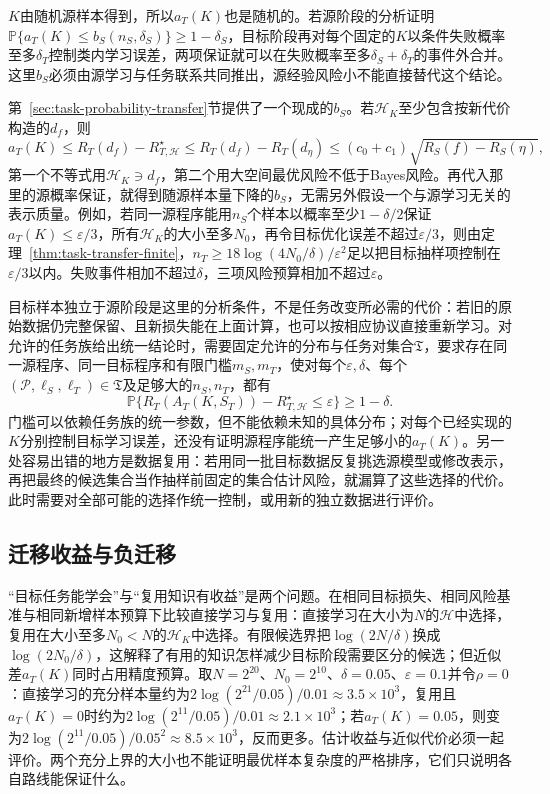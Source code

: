 $K$由随机源样本得到，所以$a_T(K)$也是随机的。若源阶段的分析证明$\mathbb P\{a_T(K)\leq b_S(n_S,\delta_S)\}\geq1-\delta_S$，目标阶段再对每个固定的$K$以条件失败概率至多$\delta_T$控制类内学习误差，两项保证就可以在失败概率至多$\delta_S+\delta_T$的事件外合并。这里$b_S$必须由源学习与任务联系共同推出，源经验风险小不能直接替代这个结论。

第~\ref{sec:task-probability-transfer}节提供了一个现成的$b_S$。若$\mathcal H_K$至少包含按新代价构造的$d_f$，则
\[
 a_T(K)\leq R_T(d_f)-R_{T,\mathcal H}^{\star}\leq R_T(d_f)-R_T(d_\eta)
 \leq(c_0+c_1)\sqrt{R_S(f)-R_S(\eta)} ,
\]
第一个不等式用$\mathcal H_K\ni d_f$，第二个用大空间最优风险不低于Bayes风险。再代入那里的源概率保证，就得到随源样本量下降的$b_S$，无需另外假设一个与源学习无关的表示质量。例如，若同一源程序能用$n_S$个样本以概率至少$1-\delta/2$保证$a_T(K)\leq\varepsilon/3$，所有$\mathcal H_K$的大小至多$N_0$，再令目标优化误差不超过$\varepsilon/3$，则由定理~\ref{thm:task-transfer-finite}，$n_T\geq18\log(4N_0/\delta)/\varepsilon^2$足以把目标抽样项控制在$\varepsilon/3$以内。失败事件相加不超过$\delta$，三项风险预算相加不超过$\varepsilon$。

目标样本独立于源阶段是这里的分析条件，不是任务改变所必需的代价：若旧的原始数据仍完整保留、且新损失能在上面计算，也可以按相应协议直接重新学习。对允许的任务族给出统一结论时，需要固定允许的分布与任务对集合$\mathfrak T$，要求存在同一源程序、同一目标程序和有限门槛$m_S,m_T$，使对每个$\varepsilon,\delta$、每个$(\mathcal P,\ell_S,\ell_T)\in\mathfrak T$及足够大的$n_S,n_T$，都有
\[
 \mathbb P\{R_T(A_T(K,S_T))-R_{T,\mathcal H}^{\star}\leq\varepsilon\}\geq1-\delta .
\]
门槛可以依赖任务族的统一参数，但不能依赖未知的具体分布；对每个已经实现的$K$分别控制目标学习误差，还没有证明源程序能统一产生足够小的$a_T(K)$。另一处容易出错的地方是数据复用：若用同一批目标数据反复挑选源模型或修改表示，再把最终的候选集合当作抽样前固定的集合估计风险，就漏算了这些选择的代价。此时需要对全部可能的选择作统一控制，或用新的独立数据进行评价。

\subsection{迁移收益与负迁移}
\label{sec:task-transfer-benefit}

“目标任务能学会”与“复用知识有收益”是两个问题。在相同目标损失、相同风险基准与相同新增样本预算下比较直接学习与复用：直接学习在大小为$N$的$\mathcal H$中选择，复用在大小至多$N_0<N$的$\mathcal H_K$中选择。有限候选界把$\log(2N/\delta)$换成$\log(2N_0/\delta)$，这解释了有用的知识怎样减少目标阶段需要区分的候选；但近似差$a_T(K)$同时占用精度预算。取$N=2^{20}$、$N_0=2^{10}$、$\delta=0.05$、$\varepsilon=0.1$并令$\rho=0$：直接学习的充分样本量约为$2\log(2^{21}/0.05)/0.01\approx3.5\times10^3$，复用且$a_T(K)=0$时约为$2\log(2^{11}/0.05)/0.01\approx2.1\times10^3$；若$a_T(K)=0.05$，则变为$2\log(2^{11}/0.05)/0.05^2\approx8.5\times10^3$，反而更多。估计收益与近似代价必须一起评价。两个充分上界的大小也不能证明最优样本复杂度的严格排序，它们只说明各自路线能保证什么。

